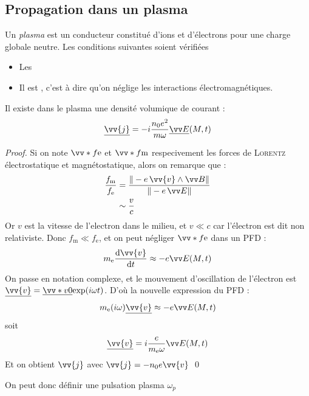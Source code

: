 \documentclass[11pt,a4paper,fleqn,pdftex]{report}
\begin{document}
\subsection{Propagation dans un plasma}
\begin{dfn}[Plasma]\label{dfn:Plasma}
Un \emph{plasma} est un conducteur constitué d'ions et d'électrons pour une charge globale neutre. \newline
Les conditions suivantes soient vérifiées
\begin{itemize}[label=$\bullet$]
    \item Les 
    \item Il est , c'est à dire qu'on néglige les interactions électromagnétiques.
\end{itemize}
\end{dfn}
\begin{theorem}
   Il existe dans le plasma une densité volumique de courant : 
\begin{equation}
\underline{\vv{j}} = -i \dfrac{n_0 e^2}{m\omega}\underline{\E}(M,t)
\end{equation}
\end{theorem}
\begin{proof}
   Si on note $\vv*{f}{\text{e}}$ et $\vv*{f}{\text{m}}$ respecivement les forces de \textsc{Lorentz} électrostatique et magnétostatique, alors on remarque que :
   \begin{align*}
      \dfrac{f_\text{m}}{f_\text{e}} &= \dfrac{\| -e\, \vv{v} \wedge \B \|}{\| -e\, \E\|} \\
                       &\sim \dfrac{v}{c}
   \end{align*}
   Or $v$ est la vitesse de l'electron dans le milieu, et $v \ll c$ car l'électron est dit \og{}non relativiste\fg{}. Donc $\boxed{f_\text{m} \ll f_\text{e}}$, et on peut négliger $\vv*{f}{\text{e}}$ dans un \gls{PFD} : 
   \[
     m_\text{e} \dfrac{\d \vv{v}}{\d t}\approx -e \E (M,t)
   \]
   On passe en notation complexe, et le mouvement d'oscillation de l'électron est $\underline{\vv{v}} = \underline{\vv*{v}{0}} \mathrm{exp}(i\omega t)$. D'où la nouvelle expression du \gls{PFD} : 
   \[
     m_\text{e} (i\omega) \underline{\vv{v}} \approx -e \E (M,t) \\
   \]
   soit
   \[
     \underline{\vv{v}} = i\dfrac{e}{m_\text{e}\omega} \E (M,t)
   \]
   Et on obtient $\vv{j}$ avec $\vv{j} = -n_0 e \vv{v}$ \qed
\end{proof}
On peut donc définir une pulsation plasma $\omega_p$
\end{document}
